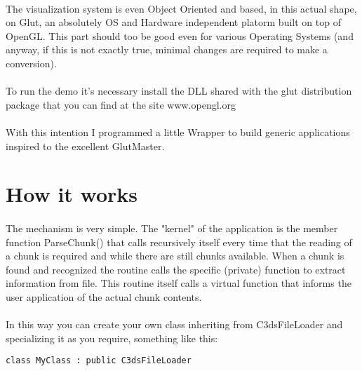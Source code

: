 \documentclass[11pt,a4paper]{article}
\begin{document}
\paragraph*{}
The visualization system is even Object Oriented and based, in this actual shape, on Glut, an absolutely OS and Hardware independent platorm built on top of OpenGL.
This part should too be good even for various Operating Systems (and anyway, if this is not exactly true, minimal changes are required to make a conversion).

\paragraph*{}
To run the demo it's necessary install the DLL shared with the glut distribution package that you can find at the site www.opengl.org

\paragraph*{}
With this intention I programmed a little Wrapper to build generic applications inspired to the excellent GlutMaster.

\section*{How it works}

\paragraph*{}
The mechanism is very simple. The "kernel" of the application is the member function ParseChunk() that calls recursively itself every time that the reading of a chunk is required and while there are still chunks available. When a chunk is found and recognized the routine calls the specific (private) function to extract information from file. This routine itself calls a virtual function that informs the user application of the actual chunk contents.

\paragraph*{}
In this way you can create your own class inheriting from C3dsFileLoader and specializing it as you require, something like this:

\begin{verbatim}
class MyClass : public C3dsFileLoader
\end{verbatim}
\end{document}
